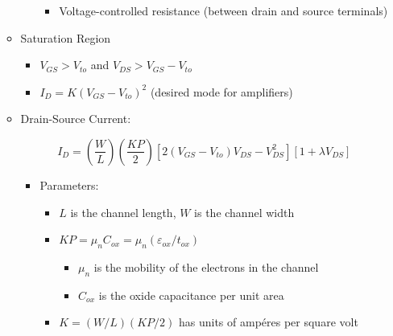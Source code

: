 \begin{itemize}
\begin{itemize}
\begin{itemize}
\begin{itemize}
              \item Voltage-controlled resistance (between drain and source terminals)

            \end{itemize}

        \end{itemize}

      \item Saturation Region

        \begin{itemize}

          \item $V_{GS}>V_{to}$ and $V_{DS}>V_{GS}-V_{to}$

          \item $I_D=K(V_{GS}-V_{to})^2$ (desired mode for amplifiers)

        \end{itemize}

      \item Drain-Source Current:

        $$I_D=\left( \frac{W}{L} \right)\left( \frac{KP}{2} \right)\left[ 2(V_{GS}-V_{to})V_{DS}-V_{DS}^2 \right]\left[ 1+\lambda V_{DS} \right]$$

        \begin{itemize}

          \item Parameters:

            \begin{itemize}

              \item $L$ is the channel length, $W$ is the channel width

              \item $KP=\mu_nC_{ox}=\mu_n(\varepsilon_{ox}/t_{ox})$

                \begin{itemize}

                  \item $\mu_n$ is the mobility of the electrons in the channel

                  \item $C_{ox}$ is the oxide capacitance per unit area

                \end{itemize}

              \item $K=(W/L)(KP/2)$ has units of amp\'eres per square volt


\end{itemize}
\end{itemize}
\end{itemize}
\end{itemize}
